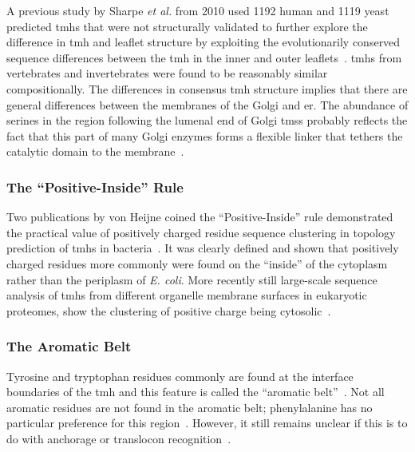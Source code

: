 A previous study by Sharpe \textit{ et al.} from 2010 used 1192 human and 1119 yeast predicted \gls{tmh}s that were not structurally validated to further explore the difference in \gls{tmh} and leaflet structure by exploiting the evolutionarily conserved sequence differences between the \gls{tmh} in the inner and outer leaflets~\cite{Sharpe2010}. \gls{tmh}s from vertebrates and invertebrates were found to be reasonably similar compositionally. The differences in consensus \gls{tmh} structure implies that there are general differences between the membranes of the Golgi and \gls{er}. The abundance of serines in the region following the lumenal end of Golgi \gls{tms}s probably reflects the fact that this part of many Golgi enzymes forms a flexible linker that tethers the catalytic domain to the membrane~\cite{Sharpe2010}.

\subsubsection{The ``Positive-Inside'' Rule}

Two publications by von Heijne coined the ``Positive-Inside'' rule demonstrated the practical value of positively charged residue sequence clustering in topology prediction of \gls{tmh}s in bacteria~\cite{VonHeijne1989,Andersson1992}. It was clearly defined and shown that positively charged residues more commonly were found on the ``inside'' of the cytoplasm rather than the periplasm of \textit{ E. coli}. More recently still large-scale sequence analysis of \gls{tmh}s from different organelle membrane surfaces in eukaryotic proteomes, show the clustering of positive charge being cytosolic~\cite{Sharpe2010, Baeza-Delgado2013, Pogozheva2013}.

\subsubsection{The Aromatic Belt}

 Tyrosine and tryptophan residues commonly are found at the interface boundaries of the \gls{tmh} and this feature is called the ``aromatic belt''~\cite{Hessa2005, Granseth2005, Sharpe2010, Baeza-Delgado2013, Nilsson2005a}. Not all aromatic residues are not found in the aromatic belt; phenylalanine has no particular preference for this region~\cite{Granseth2005, Braun1999}. However, it still remains unclear if this is to do with anchorage or translocon recognition~\cite{Baeza-Delgado2013}.

